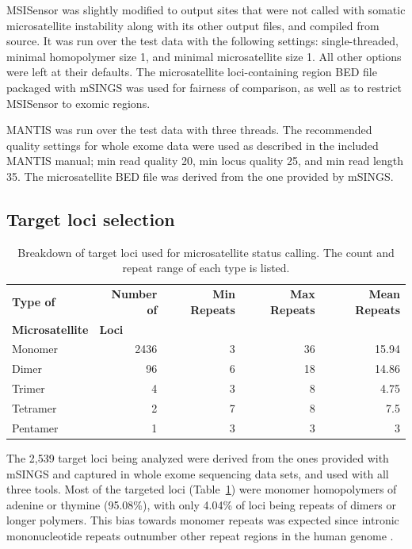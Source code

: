 MSISensor was slightly modified to output sites that were not called with somatic microsatellite instability along with its other output files, and compiled from source. It was run over the test data with the following settings: single-threaded, minimal homopolymer size 1, and minimal microsatellite size 1. All other options were left at their defaults. The microsatellite loci-containing region BED file packaged with mSINGS was used for fairness of comparison, as well as to restrict MSISensor to exomic regions.

MANTIS was run over the test data with three threads. The recommended quality settings for whole exome data were used as described in the included MANTIS manual; min read quality 20, min locus quality 25, and min read length 35. The microsatellite BED file was derived from the one provided by mSINGS\@.

\subsection{Target loci selection}
\label{ssec:msilandscape:loci_selection}
\begin{table}[H]
	\begin{center}
		\begin{tabular}{l|r|r|r|r}
			\textbf{Type of} & \textbf{Number of} & \textbf{Min Repeats} & \textbf{Max Repeats} & \textbf{Mean Repeats} \\
			\textbf{Microsatellite} & \multicolumn{1}{l|}{\textbf{Loci}} & & & \\
			\hline
			Monomer & 2436 & 3 & 36 & 15.94 \\
			Dimer & 96 & 6 & 18 & 14.86 \\
			Trimer & 4 & 3 & 8 & 4.75 \\
			Tetramer & 2 & 7 & 8 & 7.5 \\
			Pentamer & 1 & 3 & 3 & 3
		\end{tabular}
	\end{center}
	\vspace{-0.3cm}
	\caption[Breakdown of target loci used for microsatellite status calling.]{Breakdown of target loci used for microsatellite status calling. The count and repeat range of each type is listed.}
	\label{table:msilandscape:target_loci}
\end{table}
The 2,539 target loci being analyzed were derived from the ones provided with mSINGS and captured in whole exome sequencing data sets, and used with all three tools. Most of the targeted loci (Table~\ref{table:msilandscape:target_loci}) were monomer homopolymers of adenine or thymine (95.08\%), with only 4.04\% of loci being repeats of dimers or longer polymers. This bias towards monomer repeats was expected since intronic mononucleotide repeats outnumber other repeat regions in the human genome \cite{toth2000}. 


